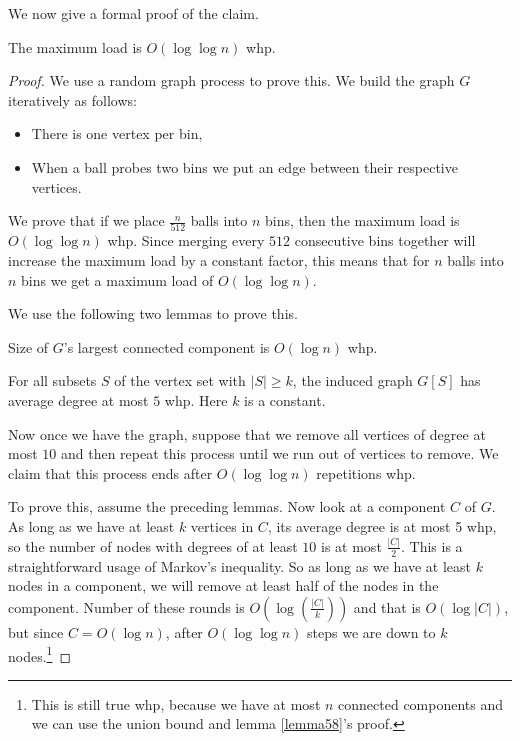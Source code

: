 We now give a formal proof of the claim.
\begin{proposition}
The maximum load is $O(\log \log n)$ whp.
\end{proposition}
\begin{proof}
We use a random graph process to prove this. We build the graph $G$ iteratively as follows:
\begin{itemize}
\item There is one vertex per bin,
\item When a ball probes two bins we put an edge between their respective vertices.
\end{itemize}

We prove that if we place $\frac{n}{512}$ balls into $n$ bins, then the maximum load is $O(\log \log n)$ whp. Since merging every $512$ consecutive bins together will increase the maximum load by a constant factor, this means that for $n$ balls into $n$ bins we get a maximum load of $O(\log \log n)$.

We use the following two lemmas to prove this.
\begin{lemma}\label{lemma57}
Size of $G$'s largest connected component is $O(\log n)$ whp.
\end{lemma}
\begin{lemma}\label{lemma58}
For all subsets $S$ of the vertex set with $\vert S \vert \geq k$, the induced graph $G[S]$ has average degree at most $5$ whp. Here $k$ is a constant.
\end{lemma}

Now once we have the graph, suppose that we remove all vertices of degree at most $10$ and then repeat this process until we run out of vertices to remove. We claim that this process ends after $O(\log \log n)$ repetitions whp. 

To prove this, assume the preceding lemmas. Now look at a component $C$ of $G$. As long as we have at least $k$ vertices in $C$, its average degree is at most 5 whp, so the number of nodes with degrees of at least $10$ is at most $\frac{\vert C \vert}{2}$. This is a straightforward usage of Markov's inequality. So as long as we have at least $k$ nodes in a component, we will remove at least half of the nodes in the component. Number of these rounds is $O(\log(\frac{\vert C\vert}{k}))$ and that is $O(\log \vert C\vert)$, but since $C = O(\log n)$, after $O(\log \log n)$ steps we are down to $k$ nodes.\footnote{This is still true whp, because we have at most $n$ connected components and we can use the union bound and lemma \ref{lemma58}'s proof.}


\end{proof}
